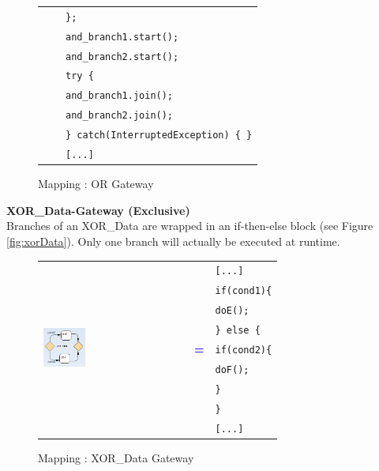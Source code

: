 \begin{figure}[h]
\begin{tabularx}{\linewidth}{lcX}
	& & \texttt{\};}\\
	& & \texttt{and\_branch1.start();}\\
	& & \texttt{and\_branch2.start();}\\
	& & \texttt{try \{}\\
	& & \texttt{\hspace{10pt}and\_branch1.join();}\\
	& & \texttt{\hspace{10pt}and\_branch2.join();}\\
	& & \texttt{\} catch(InterruptedException) \{ \}}\\
	& & \texttt{[...]}\\
\end{tabularx}
\caption{Mapping : OR Gateway}%
\label{fig:mapping_OR}%
\end{figure}


\textbf{XOR\_Data-Gateway (Exclusive)}\\
Branches of an XOR\_Data are wrapped in an if-then-else block (see Figure \ref{fig:xorData}). Only one branch will actually be executed at runtime. \\

\begin{figure}[h]
\begin{tabularx}{\linewidth}{lcX}
	\multirow{9}{*}{\includegraphics[width=0.3\textwidth]{images/mapping/xor-data.png}} &  & \texttt{[...]}\\
	& & \texttt{if(cond1)\{}\\
	& & \texttt{\hspace{10pt}doE();}\\
	& & \texttt{\} else \{}\\
	& \textbf{\textcolor{blue}{=}} & \texttt{\hspace{10pt}if(cond2)\{}\\
	& & \texttt{\hspace{20pt}doF();}\\
	& & \texttt{\hspace{10pt}\}}\\
	& & \texttt{\}}\\
	& & \texttt{[...]}\\
\end{tabularx}
\caption{Mapping : XOR\_Data Gateway}%
\label{fig:mapping_xorData}%
\end{figure}

